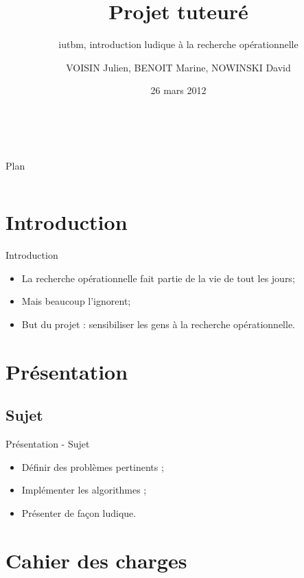 \documentclass{beamer}
\title[Projet tuteuré]{Projet tuteuré}
\subtitle[Projet Tuteuré]{iutbm, introduction ludique à la recherche opérationnelle}
\author[]{VOISIN Julien, BENOIT Marine, NOWINSKI David}
\institute{IUT informatique Belfort}
\date{26 mars 2012}
\begin{document}
\begin{frame}{~}
	\titlepage
\end{frame}

%
%

\begin{frame}{Plan}
	\begin{columns}[t]
		\begin{column}{5cm}
			\tableofcontents[sections={1-5}, hideothersubsections]
		\end{column}
		\begin{column}{5cm}
			\tableofcontents[sections={6-9}, hideothersubsections]
		\end{column}
	\end{columns}
\end{frame}

\section{Introduction}
	\begin{frame}{Introduction}
		\begin{itemize}
			\setlength{\itemsep}{0.5cm}
			\item La recherche opérationnelle fait partie de la vie de tout les jours;
			\pause
			\item Mais beaucoup l'ignorent;
			\pause
			\item But du projet : sensibiliser les gens à la recherche
			    opérationnelle.
		\end{itemize}
	\end{frame}

\section{Présentation}
	\subsection{Sujet}
		\begin{frame}{Présentation - Sujet}
			\begin{itemize}
				\setlength{\itemsep}{1cm}
				\item Définir des problèmes pertinents ;
				\item Implémenter les algorithmes ;
				\item Présenter de façon ludique.
			\end{itemize}
		\end{frame}
\section{Cahier des charges}
\end{document}
